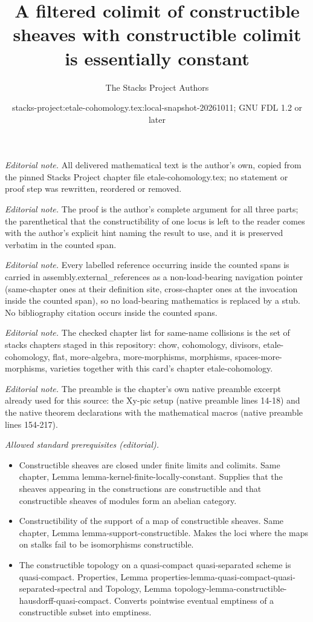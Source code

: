 \documentclass[10pt,a4paper]{amsart}
\title{A filtered colimit of constructible sheaves with constructible colimit is essentially constant}
\author{The Stacks Project Authors}
\date{stacks-project:etale-cohomology.tex:local-snapshot-20261011; GNU FDL 1.2 or later}
\theoremstyle{plain}
\theoremstyle{definition}
\theoremstyle{remark}
\numberwithin{equation}{subsection}
\begin{document}
\maketitle
\noindent\textit{Editorial note.} All delivered mathematical text is the author's own, copied from the pinned Stacks Project chapter file etale-cohomology.tex; no statement or proof step was rewritten, reordered or removed.\par\medskip
\noindent\textit{Editorial note.} The proof is the author's complete argument for all three parts; the parenthetical that the constructibility of one locus is left to the reader comes with the author's explicit hint naming the result to use, and it is preserved verbatim in the counted span.\par\medskip
\noindent\textit{Editorial note.} Every labelled reference occurring inside the counted spans is carried in assembly.external\_references as a non-load-bearing navigation pointer (same-chapter ones at their definition site, cross-chapter ones at the invocation inside the counted span), so no load-bearing mathematics is replaced by a stub. No bibliography citation occurs inside the counted spans.\par\medskip
\noindent\textit{Editorial note.} The checked chapter list for same-name collisions is the set of stacks chapters staged in this repository: chow, cohomology, divisors, etale-cohomology, flat, more-algebra, more-morphisms, morphisms, spaces-more-morphisms, varieties together with this card's chapter etale-cohomology.\par\medskip
\noindent\textit{Editorial note.} The preamble is the chapter's own native preamble excerpt already used for this source: the Xy-pic setup (native preamble lines 14-18) and the native theorem declarations with the mathematical macros (native preamble lines 154-217).\par\medskip
\noindent\textit{Allowed standard prerequisites (editorial).}\begin{itemize}
\item Constructible sheaves are closed under finite limits and colimits. Same chapter, Lemma lemma-kernel-finite-locally-constant. Supplies that the sheaves appearing in the constructions are constructible and that constructible sheaves of modules form an abelian category.
\item Constructibility of the support of a map of constructible sheaves. Same chapter, Lemma lemma-support-constructible. Makes the loci where the maps on stalks fail to be isomorphisms constructible.
\item The constructible topology on a quasi-compact quasi-separated scheme is quasi-compact. Properties, Lemma properties-lemma-quasi-compact-quasi-separated-spectral and Topology, Lemma topology-lemma-constructible-hausdorff-quasi-compact. Converts pointwise eventual emptiness of a constructible subset into emptiness.
\end{itemize}\medskip
\end{document}
